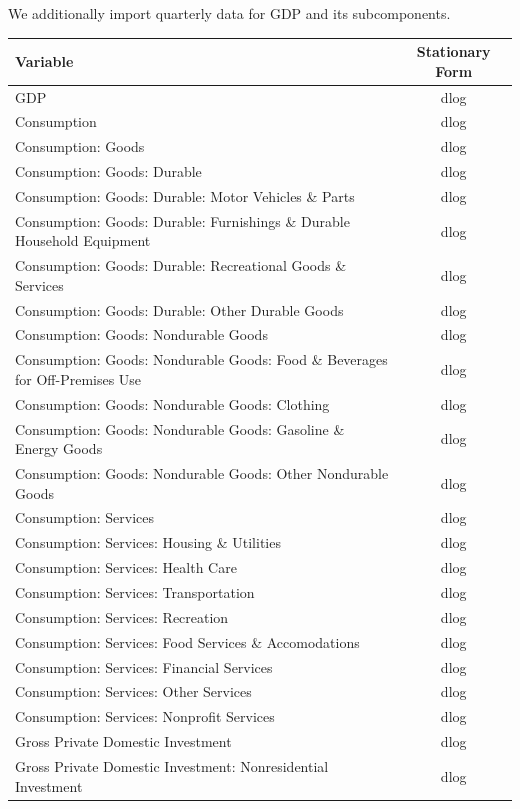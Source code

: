 \documentclass[11pt, letterpaper]{article}\usepackage[]{graphicx}\usepackage[]{color}
\begin{document}
We additionally import quarterly data for GDP and its subcomponents.
\begin{table}[H]
\centering
\begingroup\scriptsize
\begin{tabular}{lc}
  \hline
Variable & Stationary Form \\ 
  \hline
GDP & dlog \\ 
  Consumption & dlog \\ 
  Consumption: Goods & dlog \\ 
  Consumption: Goods: Durable & dlog \\ 
  Consumption: Goods: Durable: Motor Vehicles \& Parts & dlog \\ 
  Consumption: Goods: Durable: Furnishings \& Durable Household Equipment & dlog \\ 
  Consumption: Goods: Durable: Recreational Goods \& Services & dlog \\ 
  Consumption: Goods: Durable: Other Durable Goods & dlog \\ 
  Consumption: Goods: Nondurable Goods & dlog \\ 
  Consumption: Goods: Nondurable Goods: Food \& Beverages for Off-Premises Use & dlog \\ 
  Consumption: Goods: Nondurable Goods: Clothing & dlog \\ 
  Consumption: Goods: Nondurable Goods: Gasoline \& Energy Goods & dlog \\ 
  Consumption: Goods: Nondurable Goods: Other Nondurable Goods & dlog \\ 
  Consumption: Services & dlog \\ 
  Consumption: Services: Housing \& Utilities & dlog \\ 
  Consumption: Services: Health Care & dlog \\ 
  Consumption: Services: Transportation & dlog \\ 
  Consumption: Services: Recreation & dlog \\ 
  Consumption: Services: Food Services \& Accomodations & dlog \\ 
  Consumption: Services: Financial Services & dlog \\ 
  Consumption: Services: Other Services & dlog \\ 
  Consumption: Services: Nonprofit Services & dlog \\ 
  Gross Private Domestic Investment & dlog \\ 
  Gross Private Domestic Investment: Nonresidential Investment & dlog \\ 

\end{tabular}
\end{table}
\end{document}
